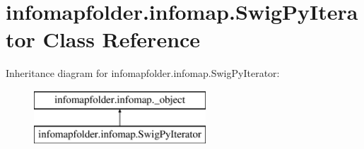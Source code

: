 \hypertarget{classinfomapfolder_1_1infomap_1_1SwigPyIterator}{}\section{infomapfolder.\+infomap.\+Swig\+Py\+Iterator Class Reference}
\label{classinfomapfolder_1_1infomap_1_1SwigPyIterator}
Inheritance diagram for infomapfolder.\+infomap.\+Swig\+Py\+Iterator\+:\begin{figure}[H]
\begin{center}
\leavevmode
\includegraphics[height=2.000000cm]{classinfomapfolder_1_1infomap_1_1SwigPyIterator}
\end{center}
\end{figure}
